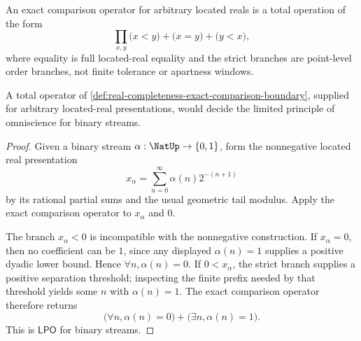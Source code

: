 
\begin{definition}
\label{def:real-completeness-exact-comparison-boundary}
An exact comparison operator for arbitrary located reals is a total operation
of the form
$$
\prod_{x,y}
\bigl(x<y\bigr)
+
\bigl(x=y\bigr)
+
\bigl(y<x\bigr),
$$
where equality is full located-real equality and the strict branches are
point-level order branches, not finite tolerance or apartness windows.
\end{definition}

\begin{theorem}
\label{thm:real-completeness-exact-comparison-omniscience}
A total operator of
\autoref{def:real-completeness-exact-comparison-boundary}, supplied for
arbitrary located-real presentations, would decide the limited principle of
omniscience for binary streams.
\end{theorem}

\begin{proof}
Given a binary stream $\alpha:\NatUp\to\{0,1\}$, form the nonnegative
located real presentation
$$
x_\alpha=\sum_{n=0}^{\infty}\alpha(n)2^{-(n+1)}
$$
by its rational partial sums and the usual geometric tail modulus.  Apply
the exact comparison operator to $x_\alpha$ and $0$.

The branch $x_\alpha<0$ is incompatible with the nonnegative construction.
If $x_\alpha=0$, then no coefficient can be $1$, since any displayed
$\alpha(n)=1$ supplies a positive dyadic lower bound.  Hence
$\forall n,\alpha(n)=0$.  If $0<x_\alpha$, the strict branch supplies a
positive separation threshold; inspecting the finite prefix needed by that
threshold yields some $n$ with $\alpha(n)=1$.  The exact comparison operator
therefore returns
$$
\bigl(\forall n,\alpha(n)=0\bigr)
+
\bigl(\exists n,\alpha(n)=1\bigr).
$$
This is $\mathsf{LPO}$ for binary streams.
\end{proof}

